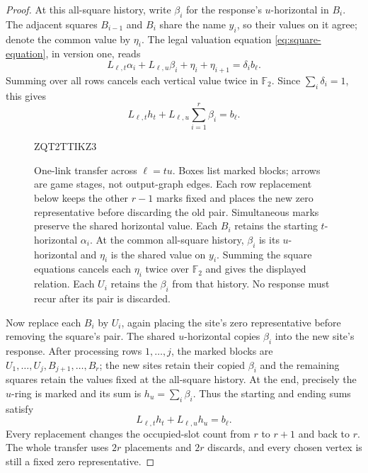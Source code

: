 \documentclass[11pt]{article}
\theoremstyle{definition}
\begin{document}
\begin{proof}
At this all-square history, write $\beta_i$ for the response's
$u$-horizontal in $B_i$.  The adjacent squares $B_{i-1}$ and $B_i$ share
the name $y_i$, so their values on it agree; denote the common value by
$\eta_i$.  The legal valuation equation
\eqref{eq:square-equation}, in version one, reads
\[
 L_{\ell,t}\alpha_i+L_{\ell,u}\beta_i+\eta_i+\eta_{i+1}
   =\delta_i b_\ell.
\]
Summing over all rows cancels each vertical value twice in $\mathbb F_2$.  Since
$\sum_i\delta_i=1$, this gives
\begin{equation}
\label{uniform:transfer-sum}
 L_{\ell,t}h_t+L_{\ell,u}\sum_{i=1}^r\beta_i=b_\ell.
\end{equation}

\begin{figure}[htbp]

ZQT2TTIKZ3
\caption{One-link transfer across \(\ell=tu\). Boxes list marked blocks;
arrows are game stages, not output-graph edges. Each row replacement below
keeps the other \(r-1\) marks fixed and places the new zero representative
before discarding the old pair. Simultaneous marks preserve the shared
horizontal value. Each \(B_i\) retains the starting \(t\)-horizontal
\(\alpha_i\). At the common all-square history, \(\beta_i\) is its
\(u\)-horizontal and \(\eta_i\) is the shared value on \(y_i\).
Summing the square equations cancels each \(\eta_i\) twice over \(\mathbb F_2\)
and gives the displayed relation. Each \(U_i\) retains the \(\beta_i\)
from that history. No response must recur after its pair is discarded.}
\label{uniform:fig-ring-transfer}
\end{figure}


Now replace each $B_i$ by $U_i$, again placing the site's zero
representative before removing the square's pair.  The shared
$u$-horizontal copies $\beta_i$ into the new site's response.  After
processing rows $1,\ldots,j$, the marked blocks are
$U_1,\ldots,U_j,B_{j+1},\ldots,B_r$; the new sites retain their copied
$\beta_i$ and the remaining squares retain the values fixed at the
all-square history.  At the end, precisely the $u$-ring is marked and its
sum is $h_u=\sum_i\beta_i$.  Thus the starting and ending sums satisfy
\begin{equation}
\label{uniform:attained-link}
 L_{\ell,t}h_t+L_{\ell,u}h_u=b_\ell.
\end{equation}
Every replacement changes the occupied-slot count from $r$ to $r+1$ and
back to $r$.  The whole transfer uses $2r$ placements and $2r$ discards,
and every chosen vertex is still a fixed zero representative.


\end{proof}
\end{document}
